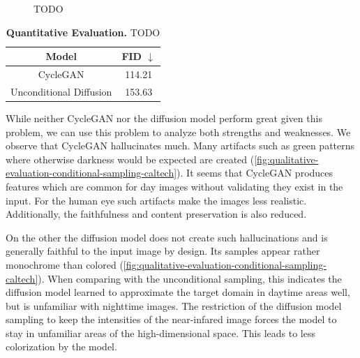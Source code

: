 \begin{figure}[htp!]
\begin{tabularx}{\textwidth}{>{\centering\arraybackslash}X >{\centering\arraybackslash}X >{\centering\arraybackslash}X >{\centering\arraybackslash}X >{\centering\arraybackslash}X >{\centering\arraybackslash}X}
    \end{tabularx}
    \caption{
        TODO
    }
    \label{fig:qualitative-evaluation-conditional-sampling-caltech}
\end{figure}

\begin{table}[htp!]
    \centering
    \begin{tabular}{c | c}
        Model                   & FID  $\downarrow$ \\
        \hline\hline
        CycleGAN                & 114.21            \\
        Unconditional Diffusion & 153.63
    \end{tabular}
    \caption{
        \textbf{Quantitative Evaluation.} TODO
    }
    \label{fig:quantitative-evaluation-conditional-sampling-caltech}
\end{table}

While neither CycleGAN nor the diffusion model perform great given this problem, we can use this problem to analyze both strengths and weaknesses.
We observe that CycleGAN hallucinates much.
Many artifacts such as green patterns where otherwise darkness would be expected are created (\autoref{fig:qualitative-evaluation-conditional-sampling-caltech}).
It seems that CycleGAN produces features which are common for day images without validating they exist in the input.
For the human eye such artifacts make the images less realistic. Additionally, the faithfulness and content preservation is also reduced.

On the other the diffusion model does not create such hallucinations and is generally faithful to the input image by design.
Its samples appear rather monochrome than colored (\autoref{fig:qualitative-evaluation-conditional-sampling-caltech}).
When comparing with the unconditional sampling, this indicates the diffusion model learned to approximate the target domain in daytime areas well, but is unfamiliar with nighttime images.
The restriction of the diffusion model sampling to keep the intensities of the near-infared image forces the model to stay in unfamiliar areas of the high-dimensional space.
This leads to less colorization by the model.

